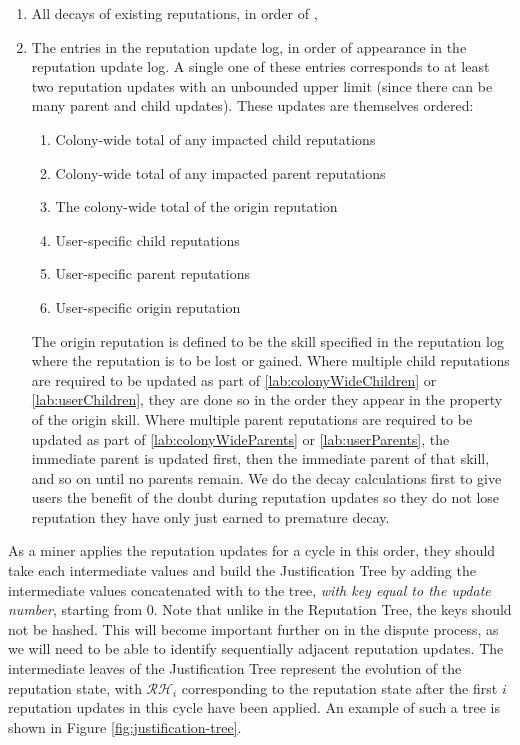 \begin{enumerate}
\item All decays of existing reputations, in order of ,
\item The entries in the reputation update log, in order of appearance in the reputation update log. A single one of these entries corresponds to at least two reputation updates with an unbounded upper limit (since there can be many parent and child updates). These updates are themselves ordered:
\begin{enumerate}
  \item Colony-wide total of any impacted child reputations \label{lab:colonyWideChildren}
  \item Colony-wide total of any impacted parent reputations \label{lab:colonyWideParents}
  \item The colony-wide total of the origin reputation
  \item User-specific child reputations \label{lab:userChildren}
  \item User-specific parent reputations\label{lab:userParents}
  \item User-specific origin reputation
\end{enumerate}
The origin reputation is defined to be the skill specified in the reputation log where the reputation is to be lost or gained. Where multiple child reputations are required to be updated as part of \ref{lab:colonyWideChildren} or \ref{lab:userChildren}, they are done so in the order they appear in the  property of the origin skill. Where multiple parent reputations are required to be updated as part of \ref{lab:colonyWideParents} or \ref{lab:userParents}, the immediate parent is updated first, then the immediate parent of that skill, and so on until no parents remain. We do the decay calculations first to give users the benefit of the doubt during reputation updates so they do not lose reputation they have only just earned to premature decay.
\end{enumerate}

As a miner applies the reputation updates for a cycle in this order, they should take each intermediate  values and build the Justification Tree by adding the intermediate  values concatenated with  to the tree, \textit{with key equal to the update number}, starting from 0. Note that unlike in the Reputation Tree, the keys should not be hashed. This will become important further on in the dispute process, as we will need to be able to identify sequentially adjacent reputation updates. The intermediate leaves of the Justification Tree represent the evolution of the reputation state, with $\mathcal{RH}_i$ corresponding to the reputation state after the first $i$ reputation updates in this cycle have been applied. An example of such a tree is shown in Figure \ref{fig:justification-tree}.

